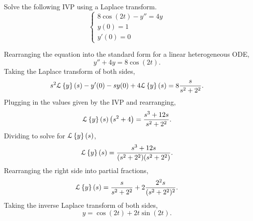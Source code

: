 \begin{example}
	Solve the following IVP using a Laplace transform.
	\begin{equation*}
		\begin{cases}
			8\cos{(2t)} - y'' = 4y\\
			y(0) = 1\\
			y'(0) = 0
		\end{cases}
	\end{equation*}
\end{example}
\noindent
Rearranging the equation into the standard form for a linear heterogeneous ODE,
\begin{equation*}
	y'' + 4y = 8\cos{(2t)}.
\end{equation*}
Taking the Laplace transform of both sides,
\begin{equation*}
	s^2\mathcal{L}\left\{ y \right\}\left(s\right) - y'(0) - sy(0) + 4\mathcal{L}\left\{ y \right\}\left(s\right) = 8\frac{s}{s^2 + 2^2}.
\end{equation*}
Plugging in the values given by the IVP and rearranging,
\begin{equation*}
	\mathcal{L}\left\{ y \right\}\left(s\right)\left(s^2 + 4\right) = \frac{s^3 + 12s}{s^2 + 2^2}.
\end{equation*}
Dividing to solve for $\mathcal{L}\left\{ y \right\}\left(s\right)$,
\begin{equation*}
	\mathcal{L}\left\{ y \right\}\left(s\right) = \frac{s^3 + 12s}{(s^2 + 2^2)(s^2 + 2^2)}.
\end{equation*}
Rearranging the right side into partial fractions,
\begin{equation*}
	\mathcal{L}\left\{ y \right\}\left(s\right) = \frac{s}{s^2 + 2^2} + 2\frac{2^2s}{(s^2+2^2)^2}.
\end{equation*}
Taking the inverse Laplace transform of both sides,
\begin{equation*}
	y = \cos{(2t)} + 2t\sin{(2t)}.
\end{equation*}